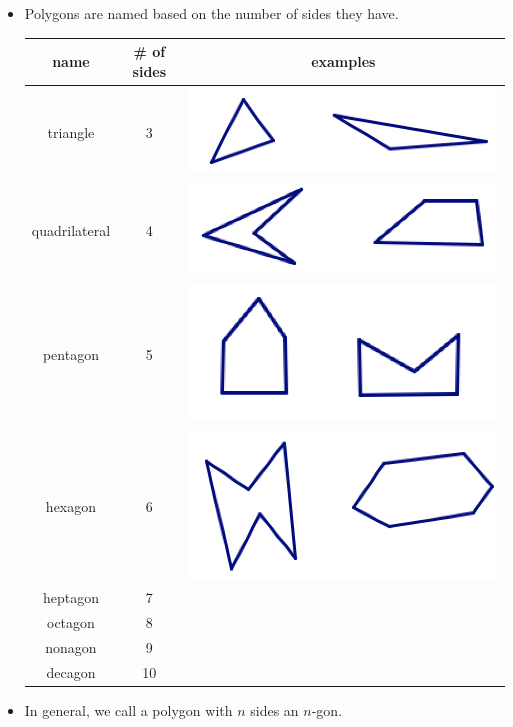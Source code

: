 \documentclass[12pt, reqno]{amsart}
\theoremstyle{remark}
\theoremstyle{definition}
\numberwithin{equation}{section}  %
\begin{document}
\begin{itemize}
\item
Polygons are named based on the number of sides they have.
\begin{center}
\begin{tabular}{c | c | c}
{\bf name} & {\bf \# of sides} & {\bf examples}\\
\hline\hline
triangle & 3 & 
\includegraphics[scale=0.5]{triex} \\
\hline
quadrilateral & 4 & 
\includegraphics[scale=0.5]{quadex} \\
\hline
pentagon & 5 & 
\includegraphics[scale=0.5]{pentex} \\
\hline
hexagon & 6 &
\includegraphics[scale=0.5]{hexex} \\
\hline
heptagon & 7 &\\
octagon & 8 & \\
nonagon & 9 & \\
decagon & 10 & 
\end{tabular}

\end{center}

\bigskip

\item
In general, we call a polygon with $n$ sides an  $n$-gon.
\end{itemize}
\end{document}
